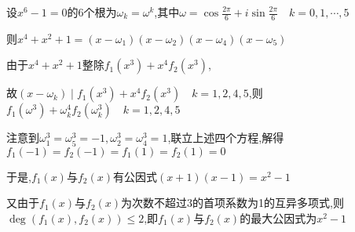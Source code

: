 \begin{solution}
    
    设$x^6-1=0$的6个根为$\omega_k=\omega^k$,其中$\omega=\cos \frac{2\pi}{6}+i\sin \frac{2\pi}{6}\quad k=0,1,\cdots,5$

    则$x^4+x^2+1=(x-\omega_1)(x-\omega_2)(x-\omega_4)(x-\omega_5)$

    由于$x^4+x^2+1$整除$f_1(x^3)+x^4f_2(x^3)$,
    
    故$(x-\omega_k) \mid f_1(x^3)+x^4f_2(x^3)\quad k=1,2,4,5$,则$f_1(\omega^3)+\omega_k^4f_2(\omega_k^3)\quad k=1,2,4,5$

    注意到$\omega_1^3=\omega_5^3=-1,\omega_2^3=\omega_4^3=1$,联立上述四个方程,解得$f_1(-1)=f_2(-1)=f_1(1)=f_2(1)=0$

    于是,$f_1(x)$与$f_2(x)$有公因式$(x+1)(x-1)=x^2-1$

    又由于$f_1(x)$与$f_2(x)$为次数不超过3的首项系数为1的互异多项式,则$\deg (f_1(x),f_2(x))\le 2$,即$f_1(x)$与$f_2(x)$的最大公因式为$x^2-1$
\end{solution}